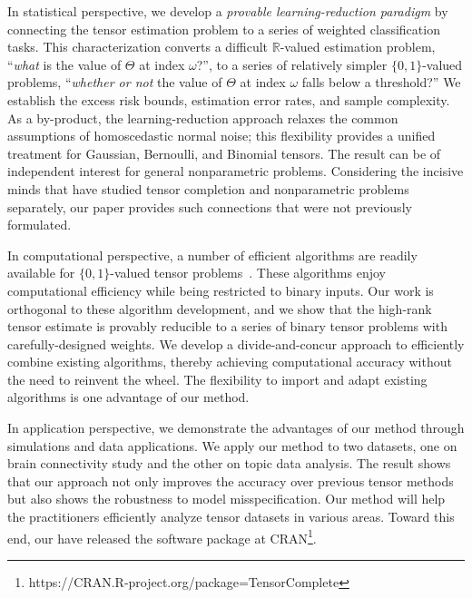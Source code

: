 \documentclass[twoside,11pt]{article}
\theoremstyle{definition}
\begin{document}
In statistical perspective, we develop a  \emph{provable learning-reduction paradigm} by connecting the tensor estimation problem to a series of weighted classification tasks. This characterization converts a difficult $\mathbb{R}$-valued estimation problem, ``\emph{what} is the value of $\Theta$ at index $\omega$?'', to a series of relatively simpler $\{0,1\}$-valued problems, ``\emph{whether or not} the value of $\Theta$ at index $\omega$ falls below a threshold?'' We establish the excess risk bounds, estimation error rates, and sample complexity. 
As a by-product, the learning-reduction approach relaxes the common assumptions of homoscedastic normal noise; this flexibility provides a unified treatment for Gaussian, Bernoulli, and Binomial tensors. The result can be of independent interest for general nonparametric problems. 
Considering the incisive minds that have studied tensor completion and nonparametric problems separately, our paper provides such connections that were not previously formulated.
 

In computational perspective, a number of efficient algorithms are readily available for $\{0,1\}$-valued tensor problems~\citep{wang2018learning, han2020optimal, ghadermarzy2018learning}. These algorithms enjoy computational efficiency while being restricted to binary inputs. Our work is orthogonal to these algorithm development, and we show that the high-rank tensor estimate is provably reducible to a series of binary tensor problems with carefully-designed weights. %
We develop a divide-and-concur approach to efficiently combine existing algorithms, thereby achieving computational accuracy without the need to reinvent the wheel. The flexibility to import and adapt existing algorithms is one advantage of our method. 

In application perspective, we demonstrate the advantages of our method through simulations and data applications. We apply our method to two datasets, one on brain connectivity study and the other on topic data analysis. The result shows that our approach not only improves the accuracy over previous tensor methods but also shows the robustness to model misspecification. Our method will help the practitioners efficiently analyze tensor datasets in various areas. Toward this end, our have released the software package at CRAN\footnote{https://CRAN.R-project.org/package=TensorComplete}.
\end{document}
